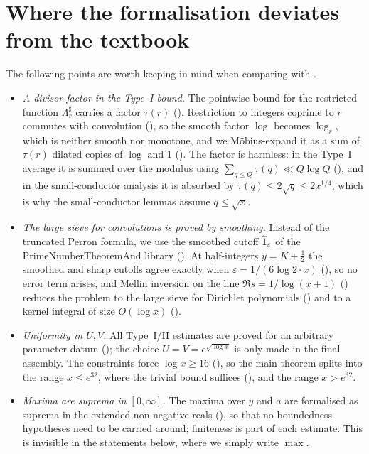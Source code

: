 \section{Where the formalisation deviates from the textbook}\label{sec:deviations}
The following points are worth keeping in mind when comparing with \cite{Koukoulopoulos2019}.
\begin{itemize}
\item \emph{A divisor factor in the Type~I bound.} The pointwise bound for the restricted function
$\Lambda^\sharp_r$ carries a factor $\tau(r)$ (). Restriction to integers
coprime to $r$ commutes with convolution (), so the smooth factor $\log$
becomes $\log_r$, which is neither smooth nor monotone, and we Möbius-expand it as a sum of $\tau(r)$
dilated copies of $\log$ and $1$ (). The factor is harmless: in the Type~I
average it is summed over the modulus using $\sum_{q \le Q} \tau(q) \ll Q \log Q$
(), and in the small-conductor analysis it is absorbed by $\tau(q) \le 2\sqrt q \le 2x^{1/4}$,
which is why the small-conductor lemmas assume $q \le \sqrt x$.
\item \emph{The large sieve for convolutions is proved by smoothing.} Instead of the truncated Perron
formula, we use the smoothed cutoff $\widetilde{1}_\varepsilon$ of the PrimeNumberTheoremAnd library
(). At half-integers $y = K + \tfrac12$ the smoothed and sharp cutoffs agree exactly
when $\varepsilon = 1/(6 \log 2 \cdot x)$ (), so no error term arises, and
Mellin inversion on the line $\Re s = 1/\log(x+1)$ () reduces the problem to the
large sieve for Dirichlet polynomials () and to a kernel integral of size
$O(\log x)$ ().
\item \emph{Uniformity in $U, V$.} All Type~I/II estimates are proved for an arbitrary parameter datum
(); the choice $U = V = e^{\sqrt{\log x}}$ is only made in the final assembly. The
constraints force $\log x \ge 16$ (), so the main theorem splits into the range
$x \le e^{32}$, where the trivial bound suffices (), and the range $x > e^{32}$.
\item \emph{Maxima are suprema in $[0, \infty]$.} The maxima over $y$ and $a$ are formalised as suprema in
the extended non-negative reals (), so that no boundedness hypotheses need to be
carried around; finiteness is part of each estimate. This is invisible in the statements below, where
we simply write $\max$.
\end{itemize}
